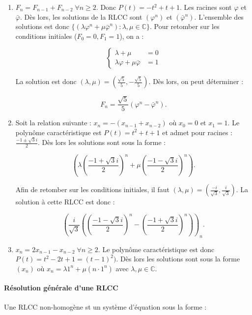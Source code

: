 \documentclass{article}
\begin{document}
			\begin{enumerate}
				\item $F_n = F_{n-1} + F_{n-2} \; \forall n \geq 2$. Donc $P(t) = -t^2 + t + 1$. Les racines sont $\varphi$ et $\bar\varphi$. Dès lors, les solutions de la RLCC sont
					  $(\varphi^n)$ et $(\bar\varphi^n)$. L'ensemble des solutions est donc $\{(\lambda \varphi^n + \mu\bar\varphi^n) : \lambda, \mu \in \mathbb C\}$.
					  Pour retomber sur les conditions initiales ($F_0 = 0, F_1 = 1$), on a :

					  \[\left\{\begin{aligned}\lambda+\mu &= 0\\\lambda \varphi + \mu\bar\varphi &= 1\end{aligned}\right.\]

					  La solution est donc $(\lambda, \mu) = (\frac {\sqrt 5}5, -\frac {\sqrt 5}5)$. Dès lors, on peut déterminer :

					  \[F_n = \frac {\sqrt 5}5(\varphi^n-\bar\varphi^n).\]
				\item Soit la relation suivante : $x_n = -(x_{n-1} + x_{n-2})$ où $x_0 = 0$ et $x_1 = 1$. Le polynôme caractéristique est $P(t) = t^2 + t + 1 $ et admet pour racines :
					  $\frac {-1 \pm \sqrt 3i}2$. Dès lors les solutions sont sous la forme :

					  \[\left(\lambda \left(\frac {-1+\sqrt 3i}2\right)^n + \mu \left(\frac {-1-\sqrt 3i}2\right)^n\right).\]

					  Afin de retomber sur les conditions initiales, il faut $(\lambda, \mu) = \left(\frac {-i}{\sqrt 3}, \frac i{\sqrt 3}\right)$. La solution à cette RLCC est donc :

					  \[\left(\frac i{\sqrt 3}\left(\left(\frac {-1-\sqrt 3i}2\right)^n - \left(\frac {-1+\sqrt 3i}2\right)^n\right)\right)_n.\]

				\item $x_n = 2x_{n-1} - x_{n-2} \; \forall n \geq 2$. Le polynôme caractéristique est donc $P(t) = t^2 - 2t + 1 = (t-1)^2)$. Dès lors les solutions sont sous la forme
					  $(x_n)$ où $x_n = \lambda 1^n + \mu(n \cdot 1^n)$ avec $\lambda, \mu \in \mathbb C$.
			\end{enumerate}

			\paragraph{Résolution générale d'une RLCC} Une RLCC non-homogène st un système d'équation sous la forme :
\end{document}
